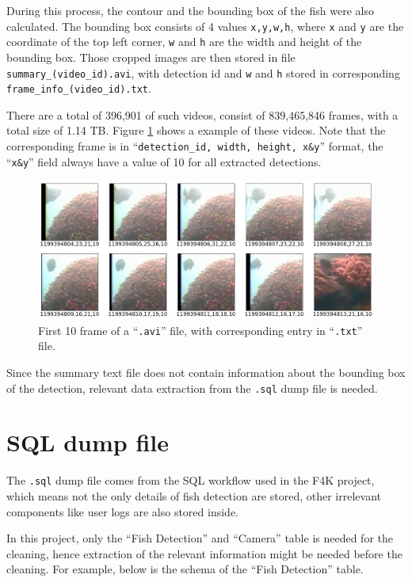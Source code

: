\documentclass[bsc,logo,twoside,fullspacing,parskip]{infthesis}
\begin{document}
During this process, the contour and the bounding box of the fish were also calculated.
The bounding box consists of 4 values {\tt x,y,w,h}, where {\tt x} and {\tt y} are the coordinate of the top left corner, {\tt w} and {\tt h} are the width and height of the bounding box. 
Those cropped images are then stored in file {\tt summary\_(video\_id).avi}, with detection id and {\tt w} and {\tt h} stored in corresponding {\tt frame\_info\_(video\_id).txt}.

There are a total of 396,901 of such videos, consist of 839,465,846 frames, with a total size of 1.14 TB. 
Figure \ref{fig:summryfile} shows a example of these videos. 
Note that the corresponding frame is in ``{\tt detection\_id, width, height, x\&y}'' format, the ``{\tt x\&y}'' field always have a value of 10 for all extracted detections.

\begin{figure}[h]
    \centering
    \includegraphics[scale=0.35]{graph/summaryfile.png}
    \caption{First 10 frame of a ``{\tt .avi}'' file, with corresponding entry in ``{\tt .txt}'' file.}
    \label{fig:summryfile}
\end{figure}

Since the summary text file does not contain information about the bounding box of the detection, relevant data extraction from the {\tt .sql} dump file is needed.

\section{SQL dump file}
\label{sec:sqld}

The {\tt .sql} dump file comes from the SQL workflow used in the F4K project, which means not the only details of fish detection are stored, other irrelevant components like user logs are also stored inside. 

In this project, only the ``Fish Detection'' and ``Camera'' table is needed for the cleaning, hence extraction of the relevant information might be needed before the cleaning.
For example, below is the schema of the ``Fish Detection'' table. 
\end{document}
